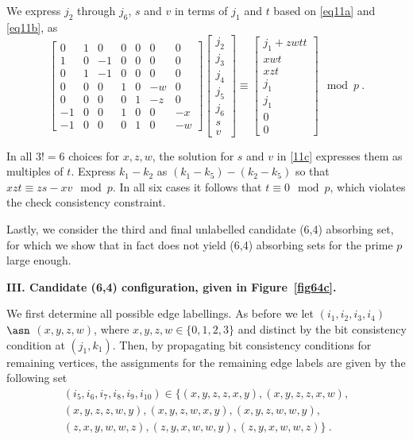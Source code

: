 {We express $j_2$ through $j_6$, $s$ and $v$ in terms of $j_1$ and
$t$ based on \eqref{eq11a} and \eqref{eq11b}, as
\begin{equation}\label{11c}
\left[ \begin{array}{ccccccc} 0 & 1 & 0 & 0 & 0 & 0 &0\\
1 & 0 & -1 & 0 & 0 & 0 &0\\
0 & 1 & -1 & 0 & 0 & 0 &0\\
0 & 0 & 0 & 1 & 0 & -w &0\\
0 & 0 & 0 & 0 & 1 & -z &0\\
-1 & 0 & 0 & 1 & 0 & 0 &-x\\
-1 & 0 & 0 & 0 & 1 & 0 &-w
\end{array}\right] \left[\begin{array}{c}
j_2\\j_3\\j_4\\j_5\\j_6\\s\\v\end{array}\right] \equiv
\left[\begin{array}{c}j_1+zwtt\\xwt\\xzt\\j_1\\j_1\\0\\0\end{array}\right]
\mod p~.
\end{equation}

In all $3!=6$ choices for $x,z,w$, the solution for $s$ and $v$ in
\eqref{11c} expresses them as multiples of $t$. Express $k_1-k_2$ as
$(k_1-k_5)-(k_2-k_5)$ so that $xzt \equiv zs-xv \mod p$. In all six
cases it follows that $t \equiv 0 \mod p$, which violates the check
consistency constraint.}

Lastly, we consider the third and final unlabelled candidate (6,4)
absorbing set, for which we show that in fact does not yield (6,4)
absorbing sets for the prime $p$ large enough.

\textbf{III. Candidate (6,4) configuration, given in
 Figure~\ref{fig64c}.}

 We first determine all possible edge labellings. As before we let
$(i_1,i_2,i_3,i_4)$ $\asn$ $(x,y,z,w)$, where $x,y,z,w \in \{0,1,2,3
\}$ and distinct by the bit consistency condition at $(j_1,k_1)$.
Then, by propagating bit consistency conditions for remaining
vertices, the assignments for the remaining edge labels are given by
the following set
\begin{eqnarray*}\label{tuples3} (i_5,i_6,i_7,i_8,i_9,i_{10}) \in
 \{(x,y,z,z,x,y),(x,y,z,z,x,w),\\(x,y,z,z,w,y),(x,y,z,w,x,y),(x,y,z,w,w,y),\\(z,x,y,w,w,z), (z,y,x,w,w,y),(z,y,x,w,w,z)\}~.
\end{eqnarray*}

